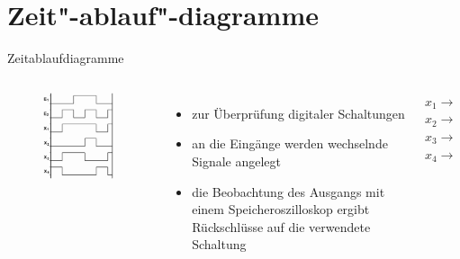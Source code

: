 \section{Zeit"-ablauf"-diagramme}
\begin{frame}{Zeitablaufdiagramme}
  \begin{columns}
    \begin{figure}
      \includegraphics[width=\textwidth,height=.7\textheight,keepaspectratio]{a14/tc707.png}
    \end{figure}
    \begin{itemize}
      \item zur Überprüfung digitaler Schaltungen
      \item an die Eingänge werden wechselnde Signale angelegt
      \item die Beobachtung des Ausgangs mit einem Speicheroszilloskop ergibt Rückschlüsse auf die verwendete Schaltung
    \end{itemize}
    \pause
    \begin{description}
      \item[$x_1\rightarrow$] 
      \item[$x_2\rightarrow$] 
      \item[$x_3\rightarrow$] 
      \item[$x_4\rightarrow$] 
    \end{description}
  \end{columns}
\end{frame}

